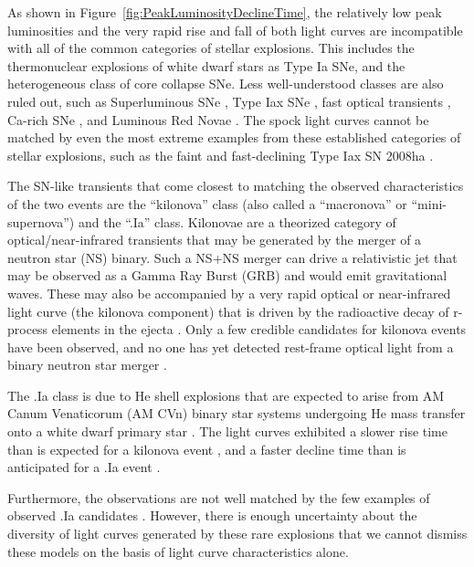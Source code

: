 As shown in Figure~\ref{fig:PeakLuminosityDeclineTime}, the relatively
low peak luminosities and the very rapid rise and fall of both \spock
light curves are incompatible with all of the common categories of
stellar explosions. This includes the thermonuclear explosions of
white dwarf stars as Type Ia SNe, and the heterogeneous class of core
collapse SNe.  Less well-understood classes are also ruled out, such
as Superluminous SNe \citep{Gal-Yam:2012,Arcavi:2016}, Type Iax SNe
\citep{Li:2003,Jha:2006a,Foley:2013a}, fast optical transients
\citep{Drout:2014}, Ca-rich SNe
\citep{Filippenko:2003,Perets:2011,Kasliwal:2012}, and Luminous Red
Novae \citep[also called intermediate luminosity red
  transients;][]{Munari:2002,Kulkarni:2007,Kasliwal:2011b}.  The spock
light curves cannot be matched by even the most extreme examples from
these established categories of stellar explosions, such as the faint
and fast-declining Type Iax SN 2008ha \citep{Foley:2009a}.

The SN-like transients that come closest to matching the observed
characteristics of the two \spock events are the ``kilonova'' class
(also called a ``macronova'' or ``mini-supernova'') and the ``.Ia''
class.  Kilonovae are a theorized category of optical/near-infrared
transients that may be generated by the merger of a neutron star (NS)
binary. Such a NS+NS merger can drive a relativistic jet that may be
observed as a Gamma Ray Burst (GRB) and would emit gravitational
waves.  These may also be accompanied by a very rapid optical or
near-infrared light curve (the kilonova component) that is driven by
the radioactive decay of r-process elements in the ejecta
\citep{Li:1998,Kulkarni:2005}.  Only a few credible candidates for
kilonova events have been observed, and no one has yet detected
rest-frame optical light from a binary neutron star merger
\citep{Perley:2009,Tanvir:2013}.

The .Ia class is due to He shell explosions that are expected to arise
from AM Canum Venaticorum (AM CVn) binary star systems undergoing He
mass transfer onto a white dwarf primary star \citep{Warner:1995,
  Nelemans:2005,Bildsten:2007}.  The \spock light curves exhibited a
slower rise time than is expected for a kilonova event
\citep[e.g.,][]{Metzger:2010,Barnes:2013,Kasen:2015}, and a faster
decline time than is anticipated for a .Ia event
\citep[e.g.,][]{Shen:2010}.

Furthermore, the \spock observations are not
well matched by the few examples of observed .Ia candidates
\citep{Kasliwal:2010, Perets:2010, Poznanski:2010}.  However, there is
enough uncertainty about the diversity of light curves generated by
these rare explosions that we cannot dismiss these models on the
basis of light curve characteristics alone.

